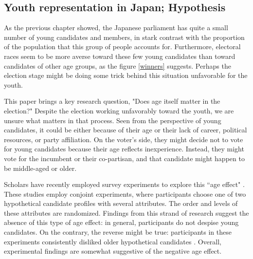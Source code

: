 \documentclass[a4paper, 12pt]{article}\usepackage[dvipdfmx]{graphicx}\usepackage[]{xcolor}
\begin{document}

\subsection{Youth representation in Japan; Hypothesis} \label{ch3.3}

As the previous chapter showed, the Japanese parliament has quite a small number of young candidates and members, in stark contrast with the proportion of the population that this group of people accounts for. Furthermore, electoral races seem to be more averse toward these few young candidates than toward candidates of other age groups, as the figure \ref{winners} suggests. Perhaps the election stage might be doing some trick behind this situation unfavorable for the youth. 

This paper brings a key research question, "Does age itself matter in the election?" Despite the election working unfavorably toward the youth, we are unsure what matters in that process. Seen from the perspective of young candidates, it could be either because of their age or their lack of career, political resources, or party affiliation. On the voter's side, they might decide not to vote for young candidates because their age reflects inexperience. Instead, they might vote for the incumbent or their co-partisan, and that candidate might happen to be middle-aged or older. 

Scholars have recently employed survey experiments to explore this ``age effect" \citep{horiuchi2020identifying, eshima2022just, mcclean2022too}. These studies employ conjoint experiments, where participants choose one of two hypothetical candidate profiles with several attributes. The order and levels of these attributes are randomized. Findings from this strand of research suggest the absence of this type of age effect: in general, participants do not despise young candidates. On the contrary, the reverse might be true: participants in these experiments consistently disliked older hypothetical candidates \footnotemark{}. Overall, experimental findings are somewhat suggestive of the negative age effect. 
\end{document}
